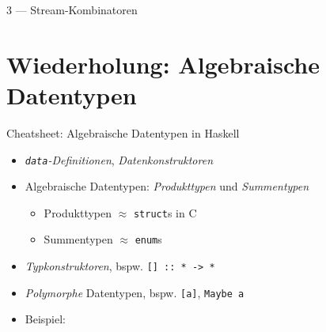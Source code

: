 \documentclass{beamer}
\begin{document}
\begin{frame}{3 --- Stream-Kombinatoren}
    \only<3>{
        \begin{equation*}
            \underbrace{
            \texttt{merge}
            \begin{cases}
            \texttt{[2\string^1, 3\string^1, 5\string^1, 7\string^1, 11\string^1, ...} \\
            \underbrace{
            \texttt{merge}
            \begin{cases}
            \texttt{[2\string^2, 3\string^2, 5\string^2, 7\string^2, 11\string^2, ...} \\
            \underbrace{
            \texttt{merge}
            \begin{cases}
            \texttt{[2\string^3, 3\string^3, 5\string^3, 7\string^3, 11\string^3, ...} \\
            \texttt{[]}
            \end{cases}
            }_{\Rightarrow^\ast \texttt{[8, 27, 64, 125, ...}}
            \end{cases}
            }_{\Rightarrow^\ast \texttt{[4, 8, 9, 25, 27, ...}}
            \end{cases}
            }_{\Rightarrow^\ast \texttt{[2, 3, 4, 5, 8, 9, 11, 13, 17, 19, 23, 25, 27, ...}}
        \end{equation*}
    }
\end{frame}

\section{Wiederholung: Algebraische Datentypen}

\begin{frame}{Cheatsheet: Algebraische Datentypen in Haskell}
  \begin{itemize}
    \item \emph{\texttt{data}-Definitionen}, \emph{Datenkonstruktoren}
    \item Algebraische Datentypen: \emph{Produkttypen} und \emph{Summentypen}
    \begin{itemize}
      \item Produkttypen $\approx$ \texttt{struct}s in C
      \item Summentypen $\approx$ \texttt{enum}s
    \end{itemize}
    \item \emph{Typkonstruktoren}, bspw. \texttt{[] :: * -> *}
    \item \emph{Polymorphe} Datentypen, bspw. \texttt{[a]}, \texttt{Maybe a}
    \item Beispiel:
  \end{itemize}
\end{frame}
\end{document}
